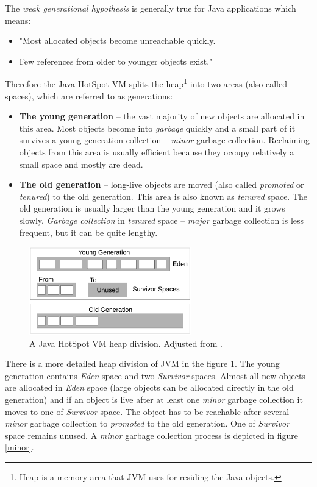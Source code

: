 \documentclass[
  digital, %
  oneside,
  notable, %
  nolof,     %
  nolot     %
]{fithesis3}
\begin{document}
The \textit{weak generational hypothesis} is generally true for Java applications which means: \cite{hunt}
\begin{itemize}
	\item "Most allocated objects become unreachable quickly.
	\item Few references from older to younger objects exist."
\end{itemize}

Therefore the Java HotSpot VM splits the heap\footnote{Heap is a memory area that JVM uses for residing the Java objects.} into two areas (also called spaces), which are referred to as generations: \cite{hunt}
\begin{itemize}
	\item \textbf{The young generation} -- the vast majority of new objects are allocated in this area. Most objects become into \textit{garbage} quickly and a small part of it survives a young generation collection -- \textit{minor} garbage collection. Reclaiming objects from this area is usually efficient because they occupy relatively a small space and mostly are dead. 
	\item \textbf{The old generation} -- long-live objects are moved (also called \textit{promoted} or \textit{tenured}) to the old generation. This area is also known as \textit{tenured} space. The old generation is usually larger than the young generation and it grows slowly. \textit{Garbage collection} in \textit{tenured} space -- \textit{major} garbage collection is less frequent, but it can be quite lengthy.
\end{itemize}

\begin{figure}[h]
	\centering
	\includegraphics[width=7cm]{fig/heap.pdf}
	\caption{A Java HotSpot VM heap division. Adjusted from \cite{hunt}.}
	\label{heap}
\end{figure}

There is a more detailed heap division of JVM in the figure \ref{heap}. The young generation contains \textit{Eden} space and two \textit{Survivor} spaces. Almost all new objects are allocated in \textit{Eden} space (large objects can be allocated directly in the old generation) and if an object is live after at least one \textit{minor} garbage collection it moves to one of \textit{Survivor} space. The object has to be reachable after several \textit{minor} garbage collection to \textit{promoted} to the old generation. One of \textit{Survivor} space remains unused. A \textit{minor} garbage collection process is depicted in figure \ref{minor}.
\end{document}
